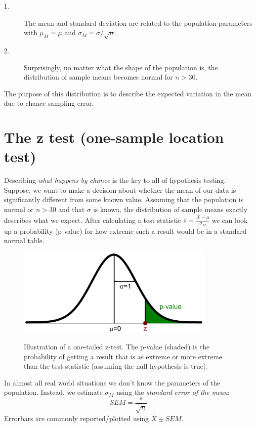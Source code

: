 \documentclass{tufte-handout}
\begin{document}
\begin{description}
\item[1.] The mean and standard deviation are related to the population parameters with $\mu_M = \mu$ and $\sigma_M=\sigma/\sqrt{n}$.
\item[2.] Surprisingly, no matter what the shape of the population is, the distribution of sample means becomes normal for $n > 30$.
\end{description}

The purpose of this distribution is to describe the expected variation in the mean due to chance sampling error.

\section{The z test (one-sample location test)}
Describing \emph{what happens by chance} is the key to all of hypothesis testing. Suppose, we want to make a decision about whether the mean of our data is significantly different from some known value. Assuming that the population is normal or $n > 30$ and that $\sigma$ is known, the distribution of sample means exactly describes what we expect. After calculating a test statistic $z=\frac{\bar{X}-\mu}{\sigma_M}$ we can look up a probability (p-value) for how extreme such a result would be in a standard normal table.
\begin{figure}
  \includegraphics[width=275pt]{handout2_ztest}%
  \label{fig:fullfig}%
  \caption{Illustration of a one-tailed z-test. The p-value (shaded) is the probability of getting a result that is as extreme or more extreme than the test statistic (assuming the null hypothesis is true).}
\end{figure}

In almost all real world situations we don't know the parameters of the population. Instead, we estimate $\sigma_M$ using the \emph{standard error of the mean}:
\begin{equation*}
SEM=\frac{s}{\sqrt{n}}
\end{equation*}					 
Errorbars are commonly reported/plotted using $\bar{X}\pm SEM$.
\end{document}
